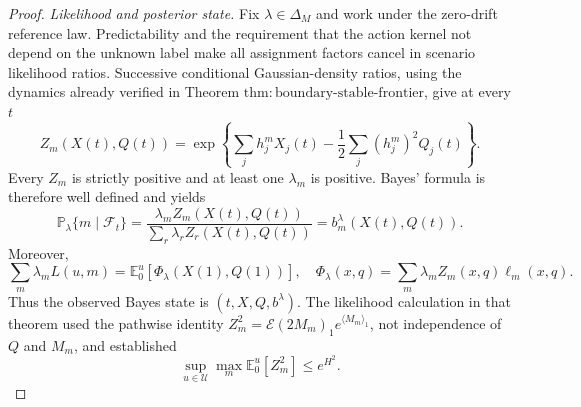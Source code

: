 \documentclass{article}
\begin{document}
\begin{proof}
\emph{Likelihood and posterior state.}  Fix \(\lambda\in\Delta_M\) and work under the zero-drift reference law.  Predictability and the requirement that the action kernel not depend on the unknown label make all assignment factors cancel in scenario likelihood ratios.  Successive conditional Gaussian-density ratios, using the dynamics already verified in Theorem \(\mathrm{thm{:}boundary\text{-}stable\text{-}frontier}\), give at every \(t\)
\[
 Z_m(X(t),Q(t))=
 \exp\!\left\{\sum_jh_j^mX_j(t)-\frac12\sum_j(h_j^m)^2Q_j(t)\right\}. \tag{9}
\]
Every \(Z_m\) is strictly positive and at least one \(\lambda_m\) is positive.  Bayes' formula is therefore well defined and yields
\[
 \mathbb P_\lambda\{m\mid\mathcal F_t\}
 =\frac{\lambda_mZ_m(X(t),Q(t))}{\sum_r\lambda_rZ_r(X(t),Q(t))}
 =b_m^\lambda(X(t),Q(t)).                                       \tag{10}
\]
Moreover,
\[
 \sum_m\lambda_mL(u,m)
 =\mathbb E_0^u\!\left[
   \Phi_\lambda(X(1),Q(1))\right],
 \quad
 \Phi_\lambda(x,q)=\sum_m\lambda_mZ_m(x,q)\ell_m(x,q).         \tag{11}
\]
Thus the observed Bayes state is \((t,X,Q,b^\lambda)\).  The likelihood calculation in that theorem used the pathwise identity \(Z_m^2=\mathcal E(2M_m)_1e^{\langle M_m\rangle_1}\), not independence of \(Q\) and \(M_m\), and established
\[
 \sup_{u\in\mathcal U}\max_m\mathbb E_0^u[Z_m^2]\leq e^{H^2}. \tag{12}
\]


\end{proof}
\end{document}
